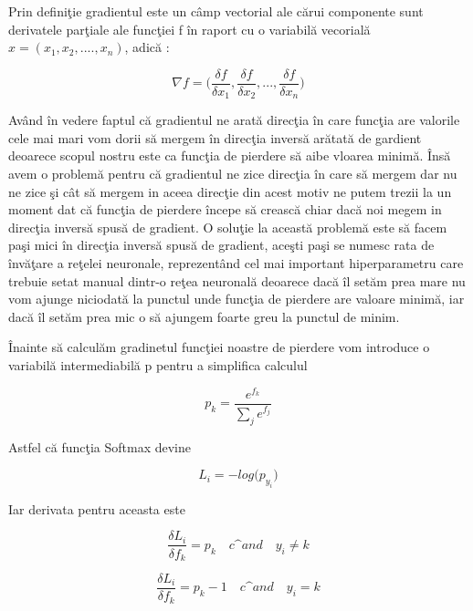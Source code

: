 \par 

Prin defini\c{t}ie gradientul este un c\^{a}mp vectorial ale c\u{a}rui componente sunt derivatele par\c{t}iale ale func\c{t}iei f \^{i}n raport cu o variabil\u{a} vecorial\u{a} $x = (x_1, x_2, ...., x_n)$, adic\u{a} :

$$\nabla f = \bigg( \frac{\delta f}{\delta x_1}, \frac{\delta f}{\delta x_2}, ... , \frac{\delta f}{\delta x_n}  \bigg)$$

Av\^{a}nd \^{i}n vedere faptul c\u{a} gradientul ne arat\u{a} direc\c{t}ia \^{i}n care func\c{t}ia are valorile cele mai mari vom dorii s\u{a} mergem \^{i}n direc\c{t}ia invers\u{a} ar\u{a}tat\u{a} de gardient deoarece scopul nostru este ca func\c{t}ia de pierdere s\u{a} aibe vloarea minim\u{a}. \^{I}ns\u{a} avem o problem\u{a} pentru c\u{a} gradientul ne zice direc\c{t}ia \^{i}n care s\u{a} mergem dar nu ne zice \c{s}i c\^{a}t s\u{a} mergem in aceea direc\c{t}ie din acest motiv ne putem trezii la un moment dat c\u{a} func\c{t}ia de pierdere \^{i}ncepe s\u{a} creasc\u{a} chiar dac\u{a} noi megem in direc\c{t}ia invers\u{a} spus\u{a} de gradient. O solu\c{t}ie la aceast\u{a} problem\u{a} este s\u{a} facem pa\c{s}i mici \^{i}n direc\c{t}ia invers\u{a} spus\u{a} de gradient, ace\c{s}ti pa\c{s}i se numesc rata de \^{i}nv\u{a}\c{t}are a re\c{t}elei neuronale, reprezent\^{a}nd cel mai important hiperparametru care trebuie setat manual dintr-o re\c{t}ea neuronal\u{a} deoarece dac\u{a} \^{i}l set\u{a}m prea mare nu vom ajunge niciodat\u{a} la punctul unde func\c{t}ia de pierdere are valoare minim\u{a}, iar dac\u{a} \^{i}l set\u{a}m prea mic o s\u{a} ajungem foarte greu la punctul de minim.

\par

\^{I}nainte s\u{a} calcul\u{a}m gradinetul func\c{t}iei noastre de pierdere vom introduce o variabil\u{a} intermediabil\u{a} p pentru a simplifica calculul

$$p_k = \frac{e^{f_k}}{\sum_j e^{f_j}}$$

Astfel c\u{a} func\c{t}ia Softmax devine

$$L_i = - log \big( p_{y_i} \big)$$

Iar derivata pentru aceasta este

$$\frac{\delta L_i}{\delta f_k } = p_k \quad c\^{a}nd \quad y_i \neq k$$

$$\frac{\delta L_i}{\delta f_k } = p_k - 1 \quad c\^{a}nd \quad y_i = k$$

